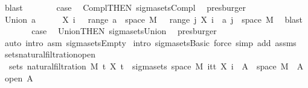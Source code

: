 \begin{isabellebody}
\ blast\isanewline
\ \ \ \ \isamarkupfalse%
\ \isamarkupfalse%
\ {\isacharquery}{\kern0pt}case\ \isamarkupfalse%
\ Compl{\isacharparenleft}{\kern0pt}{}{\isacharparenright}{\kern0pt}{\isacharbrackleft}{\kern0pt}THEN\ sigma{\isacharunderscore}{\kern0pt}sets{\isachardot}{\kern0pt}Compl{\isacharbrackright}{\kern0pt}\ \isamarkupfalse%
\ presburger\isanewline
\ \ \isamarkupfalse%
\isanewline
\ \ \ \ \isamarkupfalse%
\ {\isacharparenleft}{\kern0pt}Union\ a{\isacharparenright}{\kern0pt}\isanewline
\ \ \ \ \isamarkupfalse%
\ {\isachardoublequoteopen}X\ i\ {\isacharminus}{\kern0pt}{\isacharbackquote}{\kern0pt}\ {\isasymUnion}\ {\isacharparenleft}{\kern0pt}range\ a{\isacharparenright}{\kern0pt}\ {\isasyminter}\ space\ M\ {\isacharequal}{\kern0pt}\ {\isasymUnion}\ {\isacharparenleft}{\kern0pt}range\ {\isacharparenleft}{\kern0pt}{\isasymlambda}j{\isachardot}{\kern0pt}\ X\ i\ {\isacharminus}{\kern0pt}{\isacharbackquote}{\kern0pt}\ a\ j\ {\isasyminter}\ space\ M{\isacharparenright}{\kern0pt}{\isacharparenright}{\kern0pt}{\isachardoublequoteclose}\ \isamarkupfalse%
\ blast\isanewline
\ \ \ \ \isamarkupfalse%
\ \isamarkupfalse%
\ {\isacharquery}{\kern0pt}case\ \isamarkupfalse%
\ Union{\isacharparenleft}{\kern0pt}{}{\isacharparenright}{\kern0pt}{\isacharbrackleft}{\kern0pt}THEN\ sigma{\isacharunderscore}{\kern0pt}sets{\isachardot}{\kern0pt}Union{\isacharbrackright}{\kern0pt}\ \isamarkupfalse%
\ presburger\isanewline
\ \ \isamarkupfalse%
\ {\isacharparenleft}{\kern0pt}auto\ intro{\isacharcolon}{\kern0pt}\ asm\ sigma{\isacharunderscore}{\kern0pt}sets{\isachardot}{\kern0pt}Empty{\isacharparenright}{\kern0pt}\isanewline
{}\isamarkupfalse%
\ {\isacharparenleft}{\kern0pt}intro\ sigma{\isacharunderscore}{\kern0pt}sets{\isachardot}{\kern0pt}Basic{\isacharcomma}{\kern0pt}\ force\ simp\ add{\isacharcolon}{\kern0pt}\ assms{\isacharparenright}{\kern0pt}%
\endisatagproof
{\isafoldproof}%
%
\isadelimproof
\isanewline
%
\endisadelimproof
\isanewline
{}\isamarkupfalse%
\ sets{\isacharunderscore}{\kern0pt}natural{\isacharunderscore}{\kern0pt}filtration{\isacharunderscore}{\kern0pt}open{\isacharcolon}{\kern0pt}\ \isanewline
\ \ {\isachardoublequoteopen}sets\ {\isacharparenleft}{\kern0pt}natural{\isacharunderscore}{\kern0pt}filtration\ M\ t\ X\ t{\isacharparenright}{\kern0pt}\ {\isacharequal}{\kern0pt}\ sigma{\isacharunderscore}{\kern0pt}sets\ {\isacharparenleft}{\kern0pt}space\ M{\isacharparenright}{\kern0pt}\ {\isacharparenleft}{\kern0pt}{\isasymUnion}i{\isasymin}{\isacharbraceleft}{\kern0pt}tt{\isacharbraceright}{\kern0pt}{\isachardot}{\kern0pt}\ {\isacharbraceleft}{\kern0pt}X\ i\ {\isacharminus}{\kern0pt}{\isacharbackquote}{\kern0pt}\ A\ {\isasyminter}\ space\ M\ {\isacharbar}{\kern0pt}\ A{\isachardot}{\kern0pt}\ open\ A{\isacharbraceright}{\kern0pt}{\isacharparenright}{\kern0pt}{\isachardoublequoteclose}\isanewline

\end{isabellebody}
